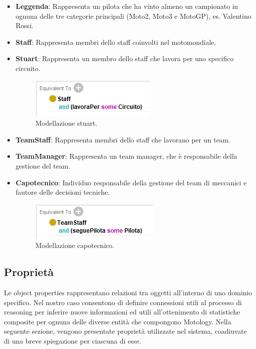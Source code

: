 \begin{itemize}
  \item \textbf{Leggenda}: Rappresenta un pilota che ha vinto almeno un campionato in ognuna delle tre categorie principali (Moto2, Moto3 e MotoGP), es. Valentino Rossi.
  \item \textbf{Staff}: Rappresenta membri dello staff coinvolti nel motomondiale.
  \item \textbf{Stuart}: Rappresenta un membro dello staff che lavora per uno specifico circuito.
    \begin{figure}[H]
    \begin{center}
        \includegraphics[scale=1]{img/spec_stuart.png}
       \caption{Modellazione stuart.} 
    \end{center}
\end{figure}
  \item \textbf{TeamStaff}: Rappresenta membri dello staff che lavorano per un team.
  \item \textbf{TeamManager}: Rappresenta un team manager, che è responsabile della gestione del team.
  \item \textbf{Capotecnico}: Individuo responsabile della gestione del team di meccanici e fautore delle decisioni tecniche.
    \begin{figure}[H]
    \begin{center}
        \includegraphics[scale=1]{img/spec_capotecnico.png}
       \caption{Modellazione capotecnico.} 
    \end{center}
\end{figure}
\end{itemize}

\subsection{Proprietà}
Le object properties rappresentano relazioni tra oggetti all'interno di uno dominio specifico. Nel nostro caso consentono di definire connessioni utili al processo di reasoning per inferire nuove informazioni ed utili all'ottenimento di statistiche composite per ognuna delle diverse entità che compongono Motology. 
Nella seguente sezione, vengono presentate proprietà utilizzate nel sistema, coadiuvate di una breve spiegazione per ciascuna di esse.

